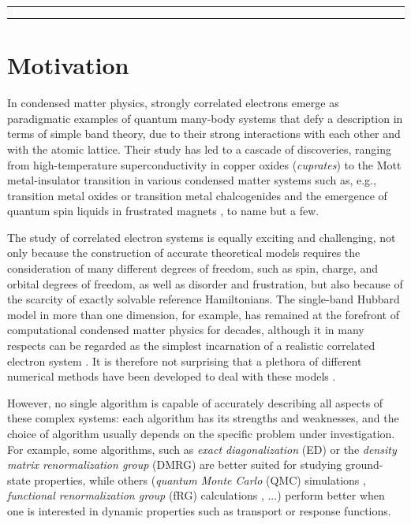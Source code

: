 \documentclass{SciPost}
\begin{document}
\vspace{10pt}
\noindent\rule{\textwidth}{1pt}

{
  \hypersetup{linkcolor=black}
  \tableofcontents\thispagestyle{fancy}
}

\noindent\rule{\textwidth}{1pt}
\vspace{10pt}

\section{Motivation}
\label{sec:intro}

In condensed matter physics, strongly correlated electrons emerge as paradigmatic examples of quantum many-body systems that defy a description in terms of simple band theory, due to their strong interactions with each other and with the atomic lattice. Their study has led to a cascade of discoveries, ranging from high-temperature superconductivity in copper oxides (\textsl{cuprates}) \cite{Bednorz1986PossibleHS, Keimer2015FromQM} to the Mott metal-insulator transition in various condensed matter systems such as, e.g., transition metal oxides or transition metal chalcogenides \cite{mott_metal-insulator_2004, hubbard_electron_1963, RevModPhys.70.1039} and the emergence of quantum spin liquids in frustrated magnets \cite{Savary2016QuantumSL, Knolle2018AFG}, to name but a few. 

The study of correlated electron systems is equally exciting and challenging, not only because the construction of accurate theoretical models requires the consideration of many different degrees of freedom, such as spin, charge, and orbital degrees of freedom, as well as disorder and frustration, but also because of the scarcity of exactly solvable reference Hamiltonians. The single-band Hubbard model in more than one dimension, for example, has remained at the forefront of computational condensed matter physics for decades, although it in many respects can be regarded as the simplest incarnation of a realistic correlated electron system \cite{Qin2021TheHM, Scalapino2012ACT}. It is therefore not surprising that a plethora of different numerical methods have been developed to deal with these models \cite{Schafer2020TrackingTF}.

However, no single algorithm is capable of accurately describing all aspects of these complex systems: each algorithm has its strengths and weaknesses, and the choice of algorithm usually depends on the specific problem under investigation. For example, some algorithms, such as \textsl{exact diagonalization} (ED) \cite{PhysRevB.42.6561, 10.1063/1.4823192, weisse2008exact} or the \textsl{density matrix renormalization group} (DMRG) \cite{PhysRevLett.69.2863, RevModPhys.77.259} are better suited for studying ground-state properties, while others (\textsl{quantum Monte Carlo} (QMC) simulations \cite{10.1063/1.1699114, doi:10.1126/science.231.4738.555, RevModPhys.73.33, becca_sorella_2017}, \textsl{functional renormalization group} (fRG) calculations \cite{WETTERICH199390, kopietz2010introduction, RevModPhys.84.299}, ...) perform better when one is interested in dynamic properties such as transport or response functions. 
\end{document}
